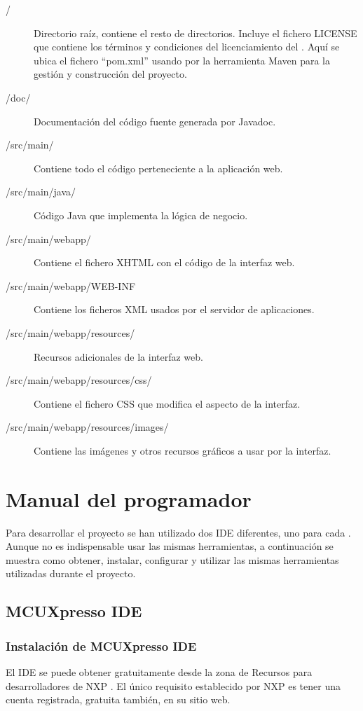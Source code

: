 \begin{description}
  \item[/] Directorio raíz, contiene el resto de directorios. Incluye el
  fichero LICENSE que contiene los términos y condiciones del licenciamiento
  del \sw{}. Aquí se ubica el
  fichero ``pom.xml'' usando por la herramienta Maven para la gestión y
  construcción del proyecto.
  \item[/doc/] Documentación del código fuente generada por Javadoc.
  \item[/src/main/] Contiene todo el código perteneciente a la aplicación web.
  \item[/src/main/java/] Código Java que implementa la lógica de negocio.
  \item[/src/main/webapp/] Contiene el fichero XHTML con el código de la
  interfaz web.
  \item[/src/main/webapp/WEB-INF] Contiene los ficheros XML usados por
  el servidor de aplicaciones.
  \item[/src/main/webapp/resources/] Recursos adicionales de la interfaz web.
  \item[/src/main/webapp/resources/css/] Contiene el fichero CSS que modifica el
  aspecto de la interfaz.
  \item[/src/main/webapp/resources/images/] Contiene las imágenes y otros
  recursos gráficos a usar por la interfaz.
\end{description}



\section{Manual del programador}
Para desarrollar el proyecto se han utilizado dos IDE diferentes, uno para cada
\sw{}. Aunque no es indispensable usar las mismas herramientas, a continuación
se muestra como obtener, instalar, configurar y utilizar las mismas herramientas
utilizadas durante el proyecto.


\subsection{MCUXpresso IDE} \label{sec:man-dev-mcuxpresso}

\subsubsection{Instalación de MCUXpresso IDE} \label{sec:instalacion-mcu}
El IDE se puede obtener gratuitamente desde la zona de Recursos para
desarrolladores de NXP \cite{webpage:mcuxpresso-ide}. El único requisito
establecido por NXP es tener una cuenta registrada, gratuita también, en su
sitio web.

